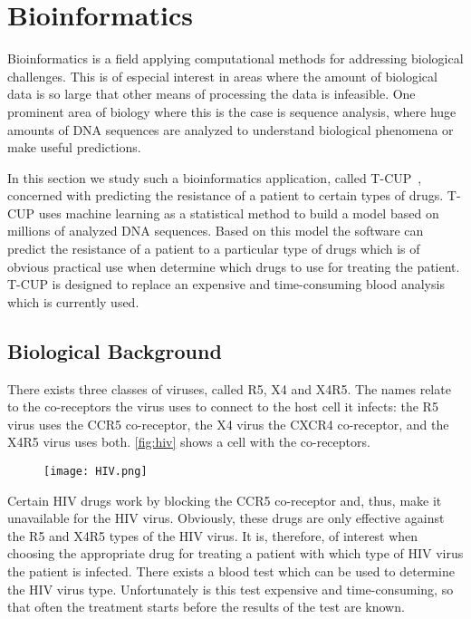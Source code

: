\section{Bioinformatics}
\label{sec:bioinfo}

Bioinformatics is a field applying computational methods for addressing biological challenges.
This is of especial interest in areas where the amount of biological data is so large that other means of processing the data is infeasible.
One prominent area of biology where this is the case is sequence analysis, where huge amounts of DNA sequences are analyzed to understand biological phenomena or make useful predictions.

In this section we study such a bioinformatics application, called T-CUP~\cite{DybowskiHeHo2010}, concerned with predicting the resistance of a patient to certain types of \HIV drugs.
T-CUP uses machine learning as a statistical method to build a model based on millions of analyzed DNA sequences.
Based on this model the software can predict the resistance of a patient to a particular type of \HIV drugs which is of obvious practical use when determine which drugs to use for treating the patient.
T-CUP is designed to replace an expensive and time-consuming blood analysis which is currently used.

\subsection*{Biological Background}
There exists three classes of \HIV viruses, called R5, X4 and X4R5.
The names relate to the co-receptors the virus uses to connect to the host cell it infects:
the R5 virus uses the {\small CCR5} co-receptor, the X4 virus the {\small CXCR4} co-receptor, and the X4R5 virus uses both.
\autoref{fig:hiv} shows a cell with the co-receptors.
\begin{figure}[t]
  \centering
  \texttt{[image: HIV.png]}
  \caption[]%
          {}
  \label{fig:hiv}
\end{figure}
Certain HIV drugs work by blocking the {\small CCR5} co-receptor and, thus, make it unavailable for the HIV virus.
Obviously, these drugs are only effective against the R5 and X4R5 types of the HIV virus.
It is, therefore, of interest when choosing the appropriate drug for treating a patient with which type of HIV virus the patient is infected.
There exists a blood test which can be used to determine the HIV virus type.
Unfortunately is this test expensive and time-consuming, so that often the treatment starts before the results of the test are known.


